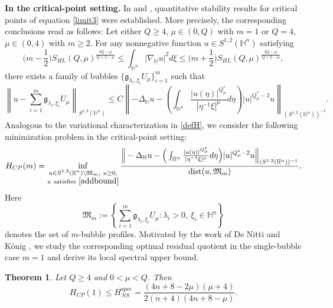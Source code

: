 \documentclass[10pt,a4paper]{amsart}
\newtheorem{theorem}{Theorem}[section]
\begin{document}
{\bf In the critical-point setting.} In \cite[Theorems 1.9-1.10]{ZXW25} and \cite[Corollary 1.5]{CW26},
quantitative stability results for critical points of equation \eqref{limit3} were established. More precisely, the corresponding conclusions read as follows:
Let either $Q\geq4$, $\mu\in(0,Q)$ with $m=1$ or $Q=4$, $\mu\in(0,4)$ with $m\geq2$.
For any nonnegative function $u\in S^{1,2}(\mathbb{H}^{n})$ satisfying
\begin{equation}\label{addbound}
 \Big(m-\frac{1}{2}\Big)S_{HL}(Q,\mu)^{\frac{2Q-\mu}{Q+2-\mu}}\leq \int_{\mathbb{H}^{n}}|\nabla_{\mathbb{H}} u|^2d\xi
 \leq \Big(m+\frac{1}{2}\Big)S_{HL}(Q,\mu)^{\frac{2Q-\mu}{Q+2-\mu}},
\end{equation}
{there exists a family of bubbles $\{\mathfrak{g}_{\lambda_i,\xi_i}U_\mu\}_{i=1}^{m}$ such that}
\begin{equation*}
\left\|u-\sum\limits_{i=1}^m\mathfrak{g}_{\lambda_i,\xi_i}U_\mu\right\|_{S^{1,2}(\mathbb{H}^{n})} \leq C \left\|-\Delta_{\mathbb{H}}u-\left(\int_{\mathbb{H}^{n}}\frac{|u(\eta)|^{Q^{\ast}_{\mu}}}{|\eta^{-1}\xi|^{\mu}}{d}\eta\right)|u|^{Q^{\ast}_{\mu}-2}u\right\|_{(S^{1,2}(\mathbb{H}^{n}))^{-1}}.
\end{equation*}
Analogous to the variational characterization in \eqref{defH}, we consider the following minimization problem in the critical-point setting:
\begin{equation*}
 {H_{CP}(m)=\inf\limits_{\substack{u\in S^{1,2}(\mathbb{H}^{n})\setminus \mathfrak{M}_m,\ u\ge0,\\ u~\mathrm{satisfies}~\eqref{addbound}}}\frac{\Big\|-\Delta_{\mathbb{H}}u-\Big(\int_{\mathbb{H}^{n}}\frac{|u(\eta)|^{Q^{\ast}_{\mu}}}{|\eta^{-1}\xi|^{\mu}}{d}\eta\Big)
 |u|^{Q^{\ast}_{\mu}-2}u\Big\|_{(S^{1,2}(\mathbb{H}^{n}))^{-1}}}{\mathrm{dist}(u,\mathfrak{M}_m)}.}
\end{equation*}
{Here
\[
\mathfrak{M}_m:=\left\{\sum_{i=1}^{m}\mathfrak{g}_{\lambda_i,\xi_i}U_\mu:\lambda_i>0,\ \xi_i\in\mathbb{H}^{n}\right\}
\]
denotes the set of $m$-bubble profiles.} {Motivated by the work of De Nitti and K\"{o}nig \cite{DK23}, we study the corresponding optimal residual quotient in the single-bubble case $m=1$ and derive its local spectral upper bound.}



\begin{theorem}\label{addthm}
\begingroup
Let $Q\ge4$ and $0<\mu<Q$. Then
\begin{equation}\label{CP-nonstrict}
H_{CP}(1)\le H_{NS}^{\mathrm{spec}}
=\frac{(4n+8-2\mu)(\mu+4)}{2(n+4)(4n+8-\mu)}.
\end{equation}
\endgroup
\end{theorem}
\end{document}
